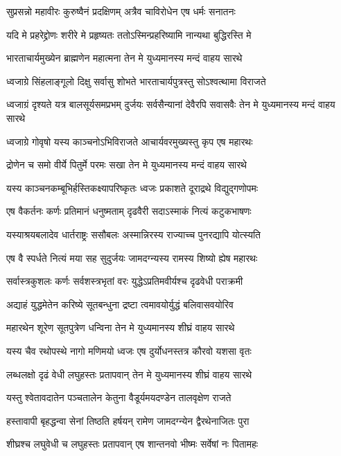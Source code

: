 \twolineshloka
{सुप्रसन्नो महावीरः कुरुष्वैनं प्रदक्षिणम्}
{अत्रैव चाविरोधेन एष धर्मः सनातनः}


\twolineshloka
{यदि मे प्रहरेद्द्रोणः शरीरे मे प्रहृष्यतः}
{ततोऽस्मिन्प्रहरिष्यामि नान्यथा बुद्धिरस्ति मे}


\twolineshloka
{भारताचार्यमुख्येन ब्राह्मणेन महात्मना}
{तेन मे युध्यमानस्य मन्दं वाहय सारथे}


\twolineshloka
{ध्वजाग्रे सिंहलाङ्गूलो दिक्षु सर्वासु शोभते}
{भारताचार्यपुत्रस्तु सोऽश्वत्थामा विराजते}


\threelineshloka
{ध्वजाग्रं दृश्यते यत्र बालसूर्यसमप्रभम्}
{दुर्जयः सर्वसैन्यानां देवैरपि सवासवैः}
{तेन मे युध्यमानस्य मन्दं वाहय सारथे}


\twolineshloka
{ध्वजाग्रे गोवृषो यस्य काञ्चनोऽभिविराजते}
{आचार्यवरमुख्यस्तु कृप एष महारथः}


\twolineshloka
{द्रोणेन च समो वीर्ये पितुर्मे परमः सखा}
{तेन मे युध्यमानस्य मन्दं वाहय सारथे}


\twolineshloka
{यस्य काञ्चनकम्बूभिर्हस्तिकक्ष्यापरिष्कृतः}
{ध्वजः प्रकाशते दूराद्रथे विद्युद्गणोपमः}


\twolineshloka
{एष वैकर्तनः कर्णः प्रतिमानं धनुष्मताम्}
{दृढवैरी सदाऽस्माकं नित्यं कटुकभाषणः}


\twolineshloka
{यस्याश्रयबलादेव धार्तराष्ट्रः ससौबलः}
{अस्मान्निरस्य राज्याच्च पुनरद्यापि योत्स्यति}


\twolineshloka
{एष वै स्पर्धते नित्यं मया सह सुदुर्जयः}
{जामदग्न्यस्य रामस्य शिष्यो ह्येष महारथः}


\twolineshloka
{सर्वास्त्रकुशलः कर्णः सर्वशस्त्रभृतां वरः}
{युद्धेऽप्रतिमवीर्यश्च दृढवेधी पराक्रमी}


\twolineshloka
{अद्याहं युद्धमेतेन करिष्ये सूतबन्धुना}
{द्रष्टा त्वमावयोर्युद्धं बलिवासवयोरिव}


\twolineshloka
{महारथेन शूरेण सूतपुत्रेण धन्विना}
{तेन मे युध्यमानस्य शीघ्रं वाहय सारथे}


\twolineshloka
{यस्य चैव रथोपस्थे नागो मणिमयो ध्वजः}
{एष दुर्योधनस्तत्र कौरवो यशसा वृतः}


\twolineshloka
{लब्धलक्षो दृढं वेधी लघुहस्तः प्रतापवान्}
{तेन मे युध्यमानस्य शीघ्रं वाहय सारथे}


\twolineshloka
{यस्तु श्वेतावदातेन पञ्चतालेन केतुना}
{वैडूर्यमयदण्डेन तालवृक्षेण राजते}


\twolineshloka
{हस्तावापी बृहद्धन्वा सेनां तिष्ठति हर्षयन्}
{रामेण जामदग्न्येन द्वैरथेनाजितः पुरा}


\twolineshloka
{शीघ्रश्च लघुवेधी च लघुहस्तः प्रतापवान्}
{एष शान्तनवो भीष्मः सर्वेषां नः पितामहः}


